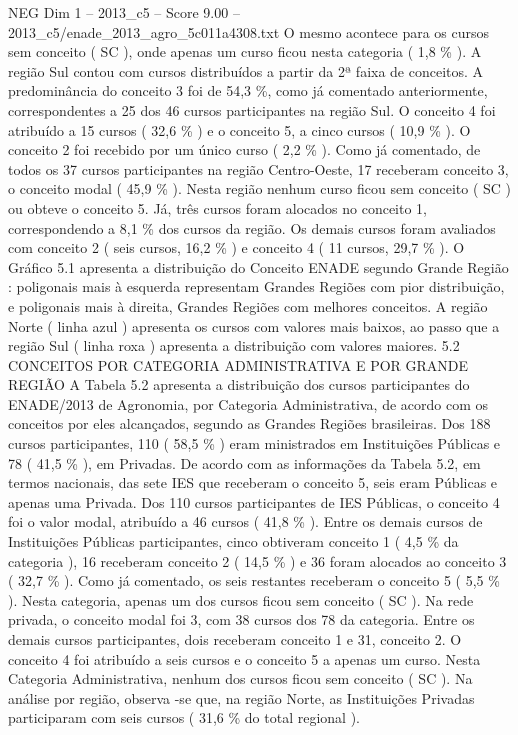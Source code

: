 \begin{textsample}{NEG Dim 1 – 2013\_c5 – Score 9.00 – 2013\_c5/enade\_2013\_agro\_5c011a4308.txt}
O mesmo acontece para os cursos sem conceito ( SC ), onde apenas um curso ficou nesta categoria ( 1,8 \% ).
A região Sul contou com cursos distribuídos a partir da 2ª faixa de conceitos.
A predominância do conceito 3 foi de 54,3 \%, como já comentado anteriormente, correspondentes a 25 dos 46 cursos participantes na região Sul.
O conceito 4 foi atribuído a 15 cursos ( 32,6 \% ) e o conceito 5, a cinco cursos ( 10,9 \% ).
O conceito 2 foi recebido por um único curso ( 2,2 \% ).
Como já comentado, de todos os 37 cursos participantes na região Centro-Oeste, 17 receberam conceito 3, o conceito modal ( 45,9 \% ).
Nesta região nenhum curso ficou sem conceito ( SC ) ou obteve o conceito 5.
Já, três cursos foram alocados no conceito 1, correspondendo a 8,1 \% dos cursos da região.
Os demais cursos foram avaliados com conceito 2 ( seis cursos, 16,2 \% ) e conceito 4 ( 11 cursos, 29,7 \% ).
O Gráfico 5.1 apresenta a distribuição do Conceito ENADE segundo Grande Região : poligonais mais à esquerda representam Grandes Regiões com pior distribuição, e poligonais mais à direita, Grandes Regiões com melhores conceitos.
A região Norte ( linha azul ) apresenta os cursos com valores mais baixos, ao passo que a região Sul ( linha roxa ) apresenta a distribuição com valores maiores. 5.2 CONCEITOS POR CATEGORIA ADMINISTRATIVA E POR GRANDE REGIÃO A Tabela 5.2 apresenta a distribuição dos cursos participantes do ENADE/2013 de Agronomia, por Categoria Administrativa, de acordo com os conceitos por eles alcançados, segundo as Grandes Regiões brasileiras.
Dos 188 cursos participantes, 110 ( 58,5 \% ) eram ministrados em Instituições Públicas e 78 ( 41,5 \% ), em Privadas.
De acordo com as informações da Tabela 5.2, em termos nacionais, das sete IES que receberam o conceito 5, seis eram Públicas e apenas uma Privada.
Dos 110 cursos participantes de IES Públicas, o conceito 4 foi o valor modal, atribuído a 46 cursos ( 41,8 \% ).
Entre os demais cursos de Instituições Públicas participantes, cinco obtiveram conceito 1 ( 4,5 \% da categoria ), 16 receberam conceito 2 ( 14,5 \% ) e 36 foram alocados ao conceito 3 ( 32,7 \% ).
Como já comentado, os seis restantes receberam o conceito 5 ( 5,5 \% ).
Nesta categoria, apenas um dos cursos ficou sem conceito ( SC ).
Na rede privada, o conceito modal foi 3, com 38 cursos dos 78 da categoria.
Entre os demais cursos participantes, dois receberam conceito 1 e 31, conceito 2.
O conceito 4 foi atribuído a seis cursos e o conceito 5 a apenas um curso.
Nesta Categoria Administrativa, nenhum dos cursos ficou sem conceito ( SC ).
Na análise por região, observa -se que, na região Norte, as Instituições Privadas participaram com seis cursos ( 31,6 \% do total regional ).

\end{textsample}
